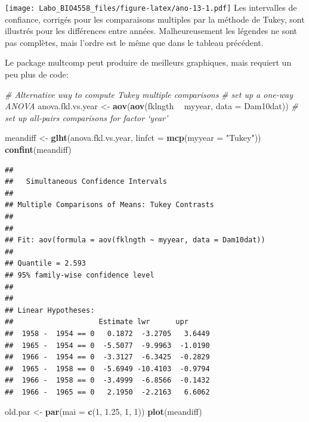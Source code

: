 \documentclass[12pt,]{book}
\newenvironment{Shaded}{\begin{snugshade}}{\end{snugshade}}
\newcommand{\CommentTok}[1]{\textcolor[rgb]{0.37,0.37,0.37}{\textit{#1}}}
\newcommand{\DataTypeTok}[1]{\textcolor[rgb]{0.27,0.27,0.27}{#1}}
\newcommand{\DecValTok}[1]{\textcolor[rgb]{0.06,0.06,0.06}{#1}}
\newcommand{\FloatTok}[1]{\textcolor[rgb]{0.06,0.06,0.06}{#1}}
\newcommand{\KeywordTok}[1]{\textcolor[rgb]{0.27,0.27,0.27}{\textbf{#1}}}
\newcommand{\NormalTok}[1]{#1}
\newcommand{\OperatorTok}[1]{\textcolor[rgb]{0.43,0.43,0.43}{\textbf{#1}}}
\newcommand{\StringTok}[1]{\textcolor[rgb]{0.5,0.5,0.5}{#1}}
\begin{document}
\texttt{[image: Labo\_BIO4558\_files/figure-latex/ano-13-1.pdf]}
Les intervalles de confiance, corrigés pour les comparaisons multiples par la méthode de Tukey, sont illustrés pour les différences entre années. Malheureusement les légendes ne sont pas complètes, mais l'ordre est le même que dans le tableau précédent.

Le package multcomp peut produire de meilleurs graphiques, mais requiert un peu plus de code:

\begin{Shaded}
\begin{Highlighting}[]
\CommentTok{# Alternative way to compute Tukey multiple comparisons}
\CommentTok{# set up a one-way ANOVA}
\NormalTok{anova.fkl.vs.year <-}\StringTok{ }\KeywordTok{aov}\NormalTok{(}\KeywordTok{aov}\NormalTok{(fklngth }\OperatorTok{~}\StringTok{ }\NormalTok{myyear, }\DataTypeTok{data =}\NormalTok{ Dam10dat))}
\CommentTok{# set up all-pairs comparisons for factor `year'}

\NormalTok{meandiff <-}\StringTok{ }\KeywordTok{glht}\NormalTok{(anova.fkl.vs.year, }\DataTypeTok{linfct =} \KeywordTok{mcp}\NormalTok{(}\DataTypeTok{myyear =}
\StringTok{"Tukey"}\NormalTok{))}
\KeywordTok{confint}\NormalTok{(meandiff)}
\end{Highlighting}
\end{Shaded}

\begin{verbatim}
## 
## 	 Simultaneous Confidence Intervals
## 
## Multiple Comparisons of Means: Tukey Contrasts
## 
## 
## Fit: aov(formula = aov(fklngth ~ myyear, data = Dam10dat))
## 
## Quantile = 2.593
## 95% family-wise confidence level
##  
## 
## Linear Hypotheses:
##                    Estimate lwr      upr     
##  1958 -  1954 == 0   0.1872  -3.2705   3.6449
##  1965 -  1954 == 0  -5.5077  -9.9963  -1.0190
##  1966 -  1954 == 0  -3.3127  -6.3425  -0.2829
##  1965 -  1958 == 0  -5.6949 -10.4103  -0.9794
##  1966 -  1958 == 0  -3.4999  -6.8566  -0.1432
##  1966 -  1965 == 0   2.1950  -2.2163   6.6062
\end{verbatim}

\begin{Shaded}
\begin{Highlighting}[]
\NormalTok{old.par <-}\StringTok{ }\KeywordTok{par}\NormalTok{(}\DataTypeTok{mai =} \KeywordTok{c}\NormalTok{(}\DecValTok{1}\NormalTok{, }\FloatTok{1.25}\NormalTok{, }\DecValTok{1}\NormalTok{, }\DecValTok{1}\NormalTok{))}
\KeywordTok{plot}\NormalTok{(meandiff)}
\end{Highlighting}
\end{Shaded}
\end{document}
